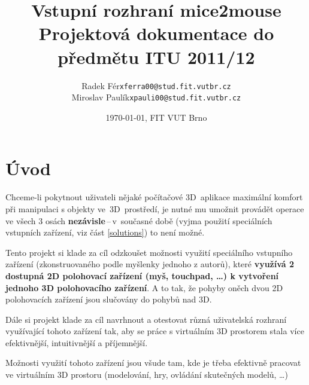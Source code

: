 \documentclass[a4paper,12pt,titlepage]{article}
\begin{document}
\renewcommand{\refname}{Literatura}

\title{\LARGE {\bf Vstupní rozhraní mice2mouse}\\
       {\large Projektová dokumentace do předmětu ITU 2011/12}}
\author{ \begin{tabularx}{\textwidth}{X r l X}
& Radek Fér & \texttt{xferra00@stud.fit.vutbr.cz} & \\
& Miroslav Paulík & \texttt{xpauli00@stud.fit.vutbr.cz} & \\
\end{tabularx}
}
\date{\today, FIT VUT Brno}

\maketitle

\newpage

\thispagestyle{empty}
\tableofcontents
\newpage
\setcounter{page}{1}



\section{Úvod}\label{intro}
Chceme-li pokytnout uživateli nějaké počítačové 3D~aplikace maximální
komfort při manipulaci s objekty ve~3D~prostředí, je nutné mu umožnit provádět
operace ve všech 3 osách {\bf nezávisle}\,--\,v~současné době (vyjma použití
speciálních vstupních zařízení, viz část \ref{solutions}) to není možné.


Tento projekt si klade za cíl odzkoušet možnosti využití speciálního
vstupního zařízení (zkonstruovaného podle myšlenky jednoho z autorů),
které {\bf využívá 2 dostupná 2D polohovací zařízení (myš, touchpad, \ldots)
k vytvoření jednoho 3D polohovacího zařízení}. A to tak, že pohyby
oněch dvou 2D polohovacích zařízení jsou slučovány do pohybů nad 3D.

Dále si projekt klade za cíl navrhnout a otestovat různá uživatelská rozhraní
využívající tohoto zařízení tak, aby se práce s virtuálním 3D prostorem
stala více efektivnější, intuitivnější a příjemnější.

Možnosti využití tohoto zařízení jsou všude tam, kde je třeba efektivně
pracovat ve virtuálním 3D prostoru (modelování, hry, ovládání skutečných
modelů, \ldots)
\end{document}
